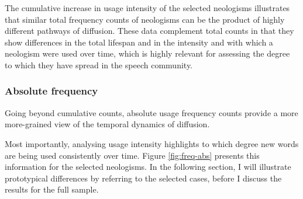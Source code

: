 \documentclass[
  a4paper,
  abstract=on,
  captions=tableabove
  ]{scrartcl}
\begin{document}
      The cumulative increase in usage intensity of the selected neologisms illustrates that similar total frequency counts of neologisms can be the product of highly different pathways of diffusion. These data complement total counts in that they show differences in the total lifespan and in the intensity and with which a neologism were used over time, which is highly relevant for assessing the degree to which they have spread in the speech community.


    \subsubsection{Absolute frequency}

      Going beyond cumulative counts, absolute usage frequency counts provide a more more-grained view of the temporal dynamics of diffusion.


      Most importantly, analysing usage intensity highlights to which degree new words are being used consistently over time. Figure \ref{fig:freq-abs} presents this information for the selected neologisms. In the following section, I will illustrate prototypical differences by referring to the selected cases, before I discuss the results for the full sample. 
\end{document}
